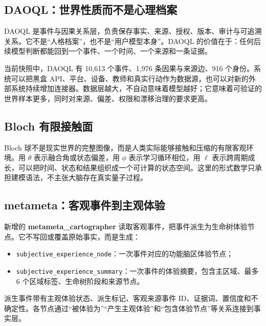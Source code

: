 \documentclass[UTF8,a4paper,11pt]{ctexart}
\newcommand{\systemname}[1]{\textsf{\textbf{#1}}}
\begin{document}
\subsection{DAOQL：世界性质而不是心理档案}

DAOQL 是事件与因果关系层，负责保存事实、来源、授权、版本、审计与可追溯关系。它不是“人格档案”，也不是“用户模型本身”。DAOQL 的价值在于：任何后续模型判断都能回到一个事件、一个时间、一个来源和一条证据。

当前快照中，DAOQL 有 10,613 个事件、1,976 条因果与来源边、916 个身份。系统可以把黑盒 API、平台、设备、教师和真实行动作为数据源，也可以对新的外部系统持续增加连接器。数据层越大，不自动意味着模型越好；它意味着可验证的世界样本更多，同时对来源、偏差、权限和漂移治理的要求更高。

\subsection{Bloch 有限接触面}

Bloch 球不是现实世界的完整图像，而是人类实际能够接触和压缩的有限客观环境。用 $\theta$ 表示融合角或状态偏差，用 $\phi$ 表示学习循环相位，用 $\ell$ 表示跨周期成长，可以把时间、状态和结果组织成一个可计算的状态空间。这里的形式数学只承担建模语法，不主张大脑存在真实量子过程。

\subsection{metameta：客观事件到主观体验}

新增的 \systemname{metameta\_cartographer} 读取客观事件，把事件派生为生命树体验节点。它不写回或覆盖原始事实，而是生成：

\begin{itemize}
\item \texttt{subjective\_experience\_node}：一次事件对应的功能脑区体验节点；
\item \texttt{subjective\_experience\_summary}：一次事件的体验摘要，包含主区域、最多 6 个区域标签、生命树阶段和来源节点。
\end{itemize}

派生事件带有主观体验状态、派生标记、客观来源事件 ID、证据词、置信度和不确定性。各节点通过“被体验为”“产生主观体验”和“包含体验节点”等关系连接到事实层。
\end{document}
